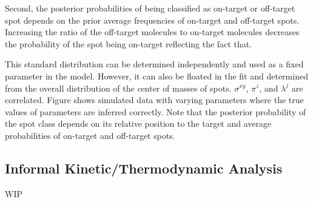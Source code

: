 Second, the posterior probabilities of being classified as on-target or off-target spot depends on the prior average frequencies of on-target and off-target spots. Increasing the ratio of the off-target molecules to on-target molecules decreases the probability of the spot being on-target reflecting the fact that.

This standard distribution can be determined independently and used as a fixed parameter in the model. However, it can also be floated in the fit and determined from the overall distribution of the center of masses of spots. $\sigma^{xy}$, $\pi^z$, and $\lambda^j$ are correlated. Figure shows simulated data with varying parameters where the true values of parameters are inferred correctly. Note that the posterior probability of the spot class depends on its relative position to the target and average probabilities of on-target and off-target spots.

\subsection{Informal Kinetic/Thermodynamic Analysis}

WIP
